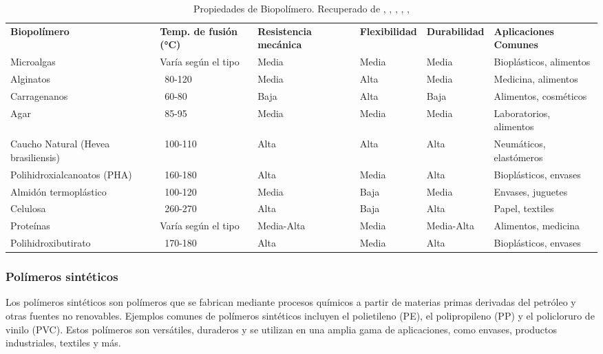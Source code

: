 \documentclass[14pt,oneside]{extarticle} %
\begin{document}
\begin{table}[H]
\centering
\small
\begin{tabular}{|>{\centering\arraybackslash}m{3.5cm}|>{\centering\arraybackslash}m{2cm}|>{\centering\arraybackslash}m{2cm}|>{\centering\arraybackslash}m{2cm}|>{\centering\arraybackslash}m{2cm}|>{\centering\arraybackslash}m{3cm}|}
\hline
\rowcolor{blue!50}
\textbf{Biopolímero} & \textbf{Temp. de fusión (°C)} & \textbf{Resistencia mecánica} & \textbf{Flexibilidad} & \textbf{Durabilidad} & \textbf{Aplicaciones Comunes} \\
Microalgas & Varía según el tipo & Media & Media & Media & Bioplásticos, alimentos \\
\hline
Alginatos & ~80-120 & Media & Alta & Media & Medicina, alimentos \\
\hline
Carragenanos & ~60-80 & Baja & Alta & Baja & Alimentos, cosméticos \\
\hline
Agar & ~85-95 & Media & Media & Media & Laboratorios, alimentos \\
\hline
Caucho Natural (Hevea brasiliensis) & ~100-110 & Alta & Alta & Alta & Neumáticos, elastómeros \\
\hline
Polihidroxialcanoatos (PHA) & ~160-180 & Alta & Media & Alta & Bioplásticos, envases \\
\hline
Almidón termoplástico & ~100-120 & Media & Baja & Media & Envases, juguetes \\
\hline
Celulosa & ~260-270 & Alta & Baja & Alta & Papel, textiles \\
\hline
Proteínas & Varía según el tipo & Media-Alta & Media & Media-Alta & Alimentos, medicina \\
\hline
Polihidroxibutirato & ~170-180 & Alta & Media & Alta & Bioplásticos, envases \\
\hline
\end{tabular}
\caption{Propiedades de Biopolímero. Recuperado de \cite{ref18}, \cite{ref19}, \cite{ref20}, \cite{ref21}, \cite{ref22}, \cite{ref23}}
\label{Tab:Propiedades Biopolimeros}
\end{table}


\subsubsection{Polímeros sintéticos}

Los polímeros sintéticos son polímeros que se fabrican mediante procesos químicos a partir de materias primas derivadas del petróleo y otras fuentes no renovables. Ejemplos comunes de polímeros sintéticos incluyen el polietileno (PE), el polipropileno (PP) y el policloruro de vinilo (PVC). Estos polímeros son versátiles, duraderos y se utilizan en una amplia gama de aplicaciones, como envases, productos industriales, textiles y más.
\end{document}
